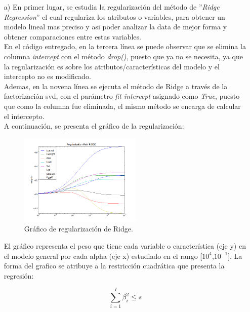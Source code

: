 \documentclass[10pt]{article}
\begin{document}
\begin{itemize}

\item[a)] En primer lugar, se estudia la regularización del método de ''\textit{Ridge Regression}'' el cual regulariza los atributos o variables, para obtener un modelo lineal mas preciso y asi poder analizar la data de mejor forma y obtener comparaciones entre estas variables.\\
En el código entregado, en la tercera línea se puede observar que se elimina la columna \textit{ intercept} con el método \textit{drop()}, puesto que ya no se necesita, ya que la regularización es sobre los atributos/características del modelo y el intercepto no es modificado.\\
Ademas, en la novena línea se ejecuta el método de Ridge a través de la factorización svd, con el parámetro \textit{fit intercept} asignado como \textit{True}, puesto que como la columna fue eliminada, el mismo método se encarga de calcular el intercepto.\\

A continuación, se presenta el gráfico de la regularización:\\

\begin{figure}[!htb]
    \centering
    \includegraphics[width=0.55\textwidth]{images/regularization_ridge}
    \caption{Gráfico de regularización de Ridge.}
    \label{ridge}
\end{figure}

El gráfico representa el peso que tiene cada variable o característica (eje y) en el modelo general por cada alpha (eje x) estudiado en el rango [$10^4$,$10^{-1}$]. La forma del grafico se atribuye a la restricción cuadrática que presenta la regresión:

\begin{equation} \label{ridge}
\sum_{i=1}^I \beta_i^2 \leq s
\end{equation} 


\end{itemize}
\end{document}

